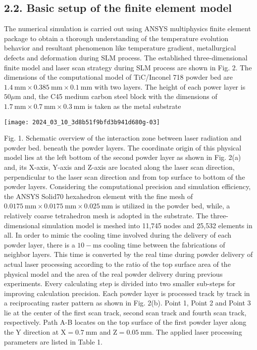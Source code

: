 \documentclass[10pt]{article}
\begin{document}
\subsection*{2.2. Basic setup of the finite element model}
The numerical simulation is carried out using ANSYS multiphysics finite element package to obtain a thorough understanding of the temperature evolution behavior and resultant phenomenon like temperature gradient, metallurgical defects and deformation during SLM process. The established three-dimensional finite model and laser scan strategy during SLM process are shown in Fig. 2. The dimensions of the computational model of TiC/Inconel 718 powder bed are $1.4 \mathrm{~mm} \times 0.385 \mathrm{~mm} \times 0.1 \mathrm{~mm}$ with two layers. The height of each power layer is $50 \mu \mathrm{m}$ and, the C45 medium carbon steel block with the dimensions of $1.7 \mathrm{~mm} \times 0.7 \mathrm{~mm} \times 0.3 \mathrm{~mm}$ is taken as the metal substrate

\begin{center}
\texttt{[image: 2024\_03\_10\_3d8b51f9bfd3b941d680g-03]}
\end{center}

Fig. 1. Schematic overview of the interaction zone between laser radiation and powder bed. beneath the powder layers. The coordinate origin of this physical model lies at the left bottom of the second powder layer as shown in Fig. 2(a) and, its X-axis, Y-axis and Z-axis are located along the laser scan direction, perpendicular to the laser scan direction and from top surface to bottom of the powder layers. Considering the computational precision and simulation efficiency, the ANSYS Solid70 hexahedron element with the fine mesh of $0.0175 \mathrm{~mm} \times 0.0175 \mathrm{~mm} \times 0.025 \mathrm{~mm}$ is utilized in the powder bed, while, a relatively coarse tetrahedron mesh is adopted in the substrate. The three-dimensional simulation model is meshed into 11,745 nodes and 25,532 elements in all. In order to mimic the cooling time involved during the delivery of each powder layer, there is a $10-\mathrm{ms}$ cooling time between the fabrications of neighbor layers. This time is converted by the real time during powder delivery of actual laser processing according to the ratio of the top surface area of the physical model and the area of the real powder delivery during previous experiments. Every calculating step is divided into two smaller sub-steps for improving calculation precision. Each powder layer is processed track by track in a reciprocating raster pattern as shown in Fig. 2(b). Point 1, Point 2 and Point 3 lie at the center of the first scan track, second scan track and fourth scan track, respectively. Path A-B locates on the top surface of the first powder layer along the $\mathrm{Y}$ direction at $\mathrm{X}=0.7 \mathrm{~mm}$ and $\mathrm{Z}=0.05 \mathrm{~mm}$. The applied laser processing parameters are listed in Table 1.
\end{document}
